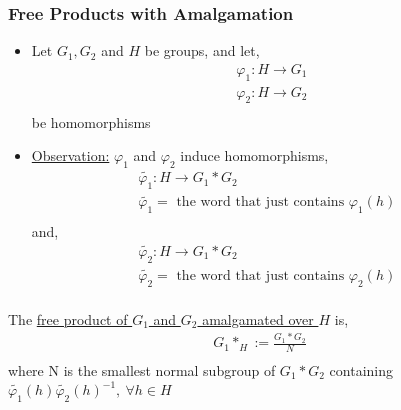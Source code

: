 \documentclass[../notes.tex]{subfiles}
\begin{document}
\subsubsection{Free Products with Amalgamation}
\begin{itemize}
    \item Let $G_1, G_2$ and $H$ be groups, and let,
        \begin{align*}
            \varphi_1:H \rightarrow G_1\\
            \varphi_2:H \rightarrow G_2\\
        \end{align*}
        be homomorphisms\\
        \begin{center}
        \end{center}
    \item \underline{Observation:} $\varphi_1$ and $\varphi_2$ induce homomorphisms,
        \begin{align*}
            \tilde{\varphi_1}:H\rightarrow G_1*G_2\\
            \tilde{\varphi_1}= \text{ the word that just contains $\varphi_1(h)$ }\\
        \end{align*}
        and,
        \begin{align*}
            \tilde{\varphi_2}:H\rightarrow G_1*G_2\\
            \tilde{\varphi_2}= \text{ the word that just contains $\varphi_2(h)$ }\\
        \end{align*}
\end{itemize}
\begin{definition}
    The \underline{free product of $G_1$ and $G_2$ amalgamated over $H$} is,
    \begin{align*}
        G_1*_{H}:= \frac{G_1*G_2}{N}\\
    \end{align*}
    where N is the smallest normal subgroup of $G_1*G_2$ containing $\tilde{\varphi_1}(h)\tilde{\varphi_2}(h)^{-1},\ \forall h\in H$
\end{definition}
\end{document}
